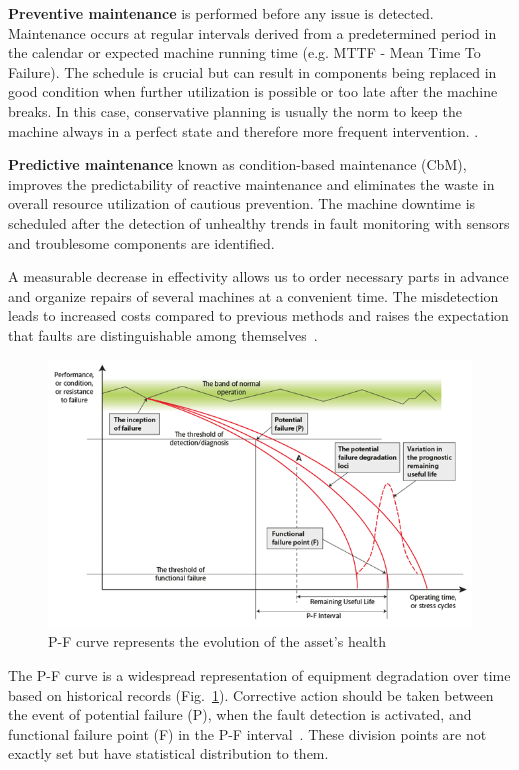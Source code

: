 \textbf{Preventive maintenance} is performed before any issue is detected. Maintenance occurs at regular intervals derived from a predetermined period in the calendar or expected machine running time (e.g. MTTF - Mean Time To Failure). The schedule is crucial but can result in components being replaced in good condition when further utilization is possible or too late after the machine breaks. In this case, conservative planning is usually the norm to keep the machine always in a perfect state and therefore more frequent intervention. \cite{mohanty_machinery_2015}.
\bigbreak

\textbf{Predictive maintenance} known as condition-based maintenance (CbM), improves the predictability of reactive maintenance and eliminates the waste in overall resource utilization of cautious prevention. The machine downtime is scheduled after the detection of unhealthy trends in fault monitoring with sensors and troublesome components are identified.

A measurable decrease in effectivity allows us to order necessary parts in advance and organize repairs of several machines at a convenient time. The misdetection leads to increased costs compared to previous methods and raises the expectation that faults are distinguishable among themselves~\cite{davies_handbook_2012}.
\bigbreak

\begin{figure}[h]
	\centering
	\includegraphics[width=\textwidth]{assets/P-F-Curve.png}
	\caption{P-F curve represents the evolution of the asset's health \cite{jennions_integrated_2011}}
	\label{fig:p-f-curve}
\end{figure}

The P-F curve is a widespread representation of equipment degradation over time based on historical records (Fig.~\ref{fig:p-f-curve}). Corrective action should be taken between the event of potential failure (P), when the fault detection is activated, and functional failure point (F) in the P-F interval~\cite{bousdekis_enterprise_2021}.  These division points are not exactly set but have statistical distribution to them.

